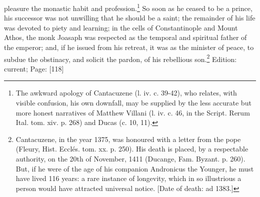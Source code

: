 pleasure the monastic habit and profession.\footnote{The awkward apology of Cantacuzene (l. iv. c. 39-42), who relates, with visible confusion, his own downfall, may be supplied by the less accurate but more honest narratives of Matthew Villani (l. iv. c. 46, in the Script. Rerum Ital. tom. xiv. p. 268) and Ducas (c. 10, 11).} So soon as he ceased to be a prince, his successor was not unwilling that he should be a saint; the remainder of his life was devoted to piety and learning; in the cells of Constantinople and Mount Athos, the monk Joasaph was respected as the temporal and spiritual father of the emperor; and, if he issued from his retreat, it was as the minister of peace, to subdue the obstinacy, and solicit the pardon, of his rebellious son.\footnote{Cantacuzene, in the year 1375, was honoured with a letter from the pope (Fleury, Hist. Ecclés. tom. xx. p. 250). His death is placed, by a respectable authority, on the 20th of November, 1411 (Ducange, Fam. Byzant. p. 260). But, if he were of the age of his companion Andronicus the Younger, he must have lived 116 years: a rare instance of longevity, which in so illustrious a person would have attracted universal notice. [Date of death: ad 1383.]}
Edition: current; Page: [118]


